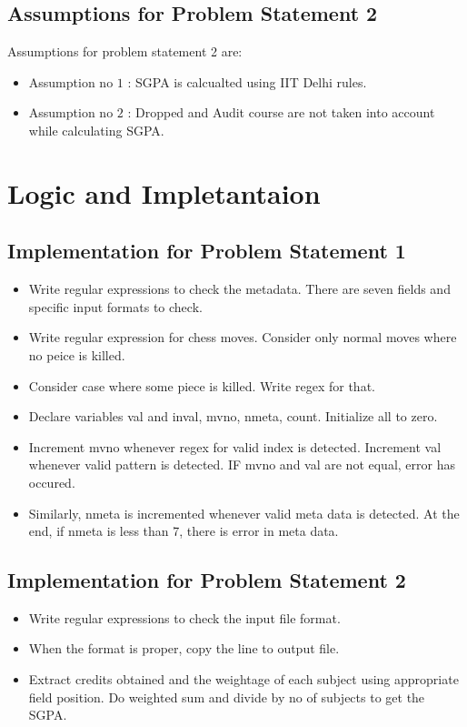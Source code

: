 \documentclass[12pt]{article}
\begin{document}
\subsection{Assumptions for Problem Statement 2}
Assumptions for problem statement 2 are:
\begin{itemize}
\item Assumption no $1$ : SGPA is calcualted using IIT Delhi rules. 
\item Assumption no $2$ : Dropped and Audit course are not taken into account while  calculating SGPA.
\end{itemize}
\newpage

\newpage

\section{Logic and Impletantaion}
\subsection{Implementation for Problem Statement 1}
\begin{itemize}
\item
Write regular expressions to check the metadata. There are seven fields and specific input formats to check.
\item
Write regular expression for chess moves. Consider only normal moves where no peice is killed.
\item
Consider case where some piece is killed. Write regex for that.
\item
Declare variables val and inval, mvno, nmeta, count. Initialize all to zero. 
\item
Increment mvno whenever regex for valid index is detected. Increment val whenever valid pattern is detected. IF mvno and val are not equal, error has occured. 
\item
Similarly, nmeta is incremented whenever valid meta data  is detected. At the end, if nmeta is less than 7, there is error in meta data.

\end{itemize}
\subsection{Implementation for Problem Statement 2}
\begin{itemize}
\item
Write regular expressions to check the input file format. 
\item
When the format is proper, copy the line to output file.
\item
Extract credits obtained and the weightage of each subject using appropriate field position. Do weighted sum and divide by no of subjects to get the SGPA.



\end{itemize}
\end{document}
